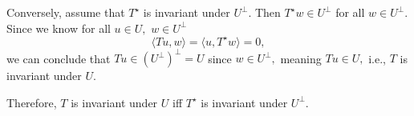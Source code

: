 \documentclass[12pt]{article}
\begin{document}
\begin{enumerate}
    Conversely, assume that $T^\star$ is invariant under $U^\perp.$
    Then $T^\star w \in U^{\perp}$ for all $w \in U^{\perp}$. Since
    we know for all $u \in U,$ $w \in U^{\perp}$ $$
    \langle Tu, w\rangle = \langle u, T^\star w \rangle = 0,
    $$
    we can conclude that $Tu \in (U^\perp)^\perp = U$ since $w \in
    U^\perp,$ meaning $Tu \in U,$ i.e., $T$ is invariant under $U.$

    Therefore, $T$ is invariant under $U$ iff $T^\star$ is invariant
    under $U^\perp.$
\end{enumerate}
\end{document}
